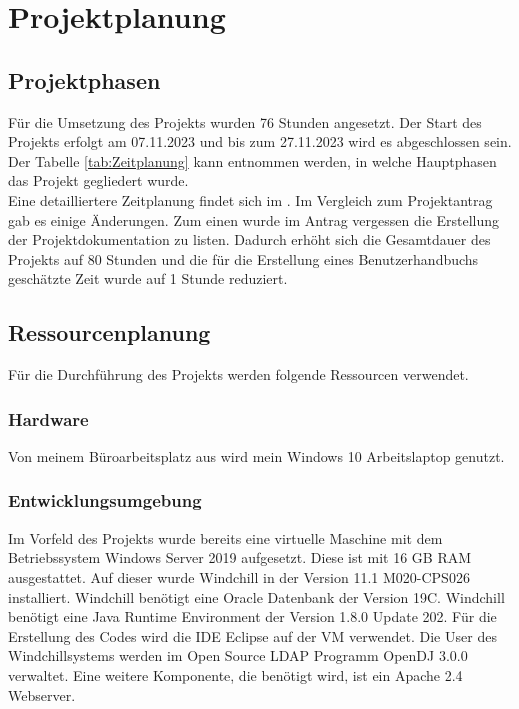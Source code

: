 \section{Projektplanung} 
\label{sec:Projektplanung}


\subsection{Projektphasen}
\label{sec:Projektphasen}

Für die Umsetzung des Projekts wurden 76 Stunden angesetzt.
Der Start des Projekts erfolgt am 07.11.2023 und bis zum 27.11.2023 wird es abgeschlossen sein.
Der Tabelle \ref{tab:Zeitplanung} kann entnommen werden, in welche Hauptphasen das Projekt gegliedert wurde.
\\
Eine detailliertere Zeitplanung findet sich im .
Im Vergleich zum Projektantrag gab es einige Änderungen.
Zum einen wurde im Antrag vergessen die Erstellung der Projektdokumentation zu listen.
Dadurch erhöht sich die Gesamtdauer des Projekts auf 80 Stunden und die für die Erstellung eines Benutzerhandbuchs geschätzte Zeit wurde auf 1 Stunde reduziert.


\subsection{Ressourcenplanung}
\label{sec:Ressourcenplanung}

Für die Durchführung des Projekts werden folgende Ressourcen verwendet.

\subsubsection{Hardware}
Von meinem Büroarbeitsplatz aus wird mein Windows 10 Arbeitslaptop genutzt.

\subsubsection{Entwicklungsumgebung}
Im Vorfeld des Projekts wurde bereits eine virtuelle Maschine mit dem Betriebssystem Windows Server 2019 aufgesetzt.
Diese ist mit 16 GB RAM ausgestattet.
Auf dieser wurde Windchill in der Version 11.1 M020-CPS026 installiert.
Windchill benötigt eine Oracle Datenbank der Version 19C.
Windchill benötigt eine Java Runtime Environment der Version 1.8.0 Update 202.
Für die Erstellung des Codes wird die IDE Eclipse auf der \acs{VM} verwendet.
Die User des Windchillsystems werden im Open Source LDAP Programm OpenDJ 3.0.0 verwaltet.
Eine weitere Komponente, die benötigt wird, ist ein Apache 2.4 Webserver.

